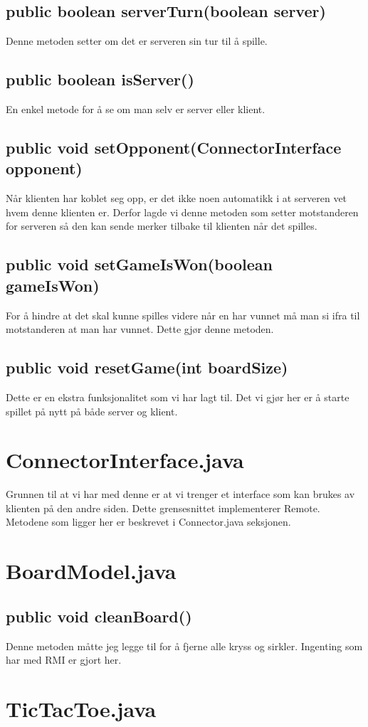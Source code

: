\documentclass[11pt, a4paper]{article}	%
\begin{document}
\subsection*{public boolean serverTurn(boolean server)}
Denne metoden setter om det er serveren sin tur til å spille.
\subsection*{public boolean isServer()}
En enkel metode for å se om man selv er server eller klient.
\subsection*{public void setOpponent(ConnectorInterface opponent)}
Når klienten har koblet seg opp, er det ikke noen automatikk i at serveren vet hvem denne klienten er. Derfor lagde vi denne metoden som setter motstanderen for serveren så den kan sende merker tilbake til klienten når det spilles.
\subsection*{public void setGameIsWon(boolean gameIsWon)}
For å hindre at det skal kunne spilles videre når en har vunnet må man si ifra til motstanderen at man har vunnet. Dette gjør denne metoden.

\subsection*{public void resetGame(int boardSize) }
Dette er en ekstra funksjonalitet som vi har lagt til. Det vi gjør her er å starte spillet på nytt på både server og klient.

\section{ConnectorInterface.java}
Grunnen til at vi har med denne er at vi trenger et interface som kan brukes av klienten på den andre siden. Dette grensesnittet implementerer Remote. Metodene som ligger her er beskrevet i Connector.java seksjonen.

\section{BoardModel.java}
\subsection*{public void cleanBoard()}
Denne metoden måtte jeg legge til for å fjerne alle kryss og sirkler. Ingenting som har med RMI er gjort her.

\section{TicTacToe.java}
\end{document}
